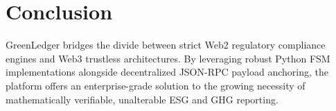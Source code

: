 \documentclass[12pt,a4paper]{article}
\begin{document}
\section{Conclusion}

GreenLedger bridges the divide between strict Web2 regulatory compliance engines and Web3 trustless architectures. By leveraging robust Python FSM implementations alongside decentralized JSON-RPC payload anchoring, the platform offers an enterprise-grade solution to the growing necessity of mathematically verifiable, unalterable ESG and GHG reporting.
\end{document}
